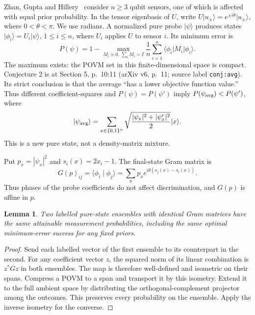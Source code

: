 \documentclass[11pt]{article}
\newtheorem{lemma}[theorem]{Lemma}
\newcommand{\ket}[1]{\lvert #1\rangle}
\newcommand{\bra}[1]{\langle #1\rvert}
\begin{document}
Zhan, Gupta and Hillery~\cite{ZGH} consider $n\geq3$ qubit sensors,
one of which is affected with equal prior probability. In the tensor
eigenbasis of $U$, write
$U\ket{u_\pm}=e^{\pm i\theta}\ket{u_\pm}$, where $0<\theta<\pi$.
We use radians. A normalized pure probe $\ket\psi$ produces states
$\ket{\phi_i}=U_i\ket\psi$, $1\leq i\leq n$, where $U_i$ applies
$U$ to sensor $i$. Its minimum error is
\begin{equation}\label{eq:error}
 P(\psi)=1-\max_{M_i\succeq0,\,\sum_iM_i=I}
 \frac1n\sum_{i=1}^n\bra{\phi_i}M_i\ket{\phi_i}.
\end{equation}
The maximum exists: the POVM set in this finite-dimensional space is compact.
Conjecture 2 is at Section 5, p.~10:11 (arXiv v6, p.~11;
source label \texttt{conj:avg}). Its strict conclusion is that the
average ``has a lower objective function value.'' Thus different coefficient-squares and
$P(\psi)=P(\psi')$ imply $P(\psi_{\rm avg})<P(\psi')$, where
\begin{equation}\label{eq:average}
 \ket{\psi_{\rm avg}}=\sum_{x\in\{0,1\}^n}
 \sqrt{\frac{|\psi_x|^2+|\psi'_x|^2}{2}}\ket x.
\end{equation}
This is a new pure state, not a density-matrix mixture.

Put $p_x=|\psi_x|^2$ and $s_i(x)=2x_i-1$. The final-state Gram matrix is
\begin{equation}\label{eq:gram}
 G(p)_{ij}=\langle\phi_i\mid\phi_j\rangle
 =\sum_x p_x e^{i\theta(s_j(x)-s_i(x))}.
\end{equation}
Thus phases of the probe coefficients do not affect discrimination, and
$G(p)$ is affine in $p$.

\begin{lemma}\label{lem:gram}
Two labelled pure-state ensembles with identical Gram matrices have
the same attainable measurement probabilities, including the same optimal
minimum-error success for any fixed priors.
\end{lemma}
\begin{proof}
Send each labelled vector of the first ensemble to its counterpart in the
second. For any coefficient vector $z$, the squared norm of its linear
combination is $z^*Gz$ in both ensembles. The map is therefore well-defined
and isometric on their spans. Compress a POVM to a span and transport it by
this isometry. Extend it to the full ambient space by distributing the
orthogonal-complement projector among the outcomes. This preserves every
probability on the ensemble. Apply the inverse isometry for the converse.
\end{proof}
\end{document}
